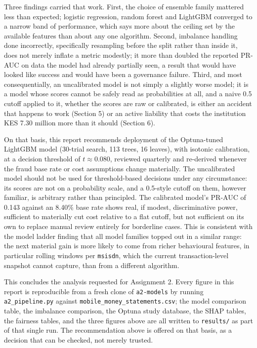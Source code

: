 \documentclass[11pt,a4paper]{article}
\begin{document}
Three findings carried that work. First, the choice of ensemble family mattered less than expected; logistic regression, random forest and LightGBM converged to a narrow band of performance, which says more about the ceiling set by the available features than about any one algorithm. Second, imbalance handling done incorrectly, specifically resampling before the split rather than inside it, does not merely inflate a metric modestly; it more than doubled the reported PR-AUC on data the model had already partially seen, a result that would have looked like success and would have been a governance failure. Third, and most consequentially, an uncalibrated model is not simply a slightly worse model; it is a model whose scores cannot be safely read as probabilities at all, and a naive 0.5 cutoff applied to it, whether the scores are raw or calibrated, is either an accident that happens to work (Section 5) or an active liability that costs the institution KES 7.30 million more than it should (Section 6).

On that basis, this report recommends deployment of the Optuna-tuned LightGBM model (30-trial search, 113 trees, 16 leaves), with isotonic calibration, at a decision threshold of $t \approx 0.080$, reviewed quarterly and re-derived whenever the fraud base rate or cost assumptions change materially. The uncalibrated model should not be used for threshold-based decisions under any circumstance: its scores are not on a probability scale, and a 0.5-style cutoff on them, however familiar, is arbitrary rather than principled. The calibrated model's PR-AUC of 0.143 against an 8.40\% base rate shows real, if modest, discriminative power, sufficient to materially cut cost relative to a flat cutoff, but not sufficient on its own to replace manual review entirely for borderline cases. This is consistent with the model ladder finding that all model families topped out in a similar range: the next material gain is more likely to come from richer behavioural features, in particular rolling windows per \texttt{msisdn}, which the current transaction-level snapshot cannot capture, than from a different algorithm.

This concludes the analysis requested for Assignment 2. Every figure in this report is reproducible from a fresh clone of \texttt{a2-models} by running \texttt{a2\_pipeline.py} against \texttt{mobile\_money\_statements.csv}; the model comparison table, the imbalance comparison, the Optuna study database, the SHAP tables, the fairness tables, and the three figures above are all written to \texttt{results/} as part of that single run. The recommendation above is offered on that basis, as a decision that can be checked, not merely trusted.
\end{document}
